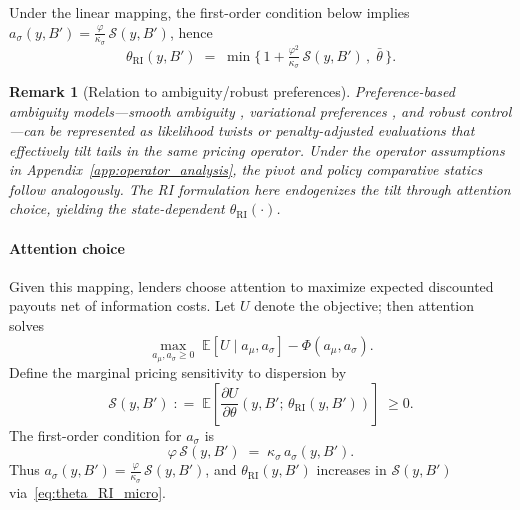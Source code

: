 \documentclass[12pt]{article}
\providecommand{\coloneqq}{\mathrel{\mathop:}=}
\theoremstyle{plain}
\newtheorem{remark}{Remark}
\newcommand{\E}{\mathbb{E}}
\begin{document}
Under the linear mapping, the first-order condition below implies
$a_\sigma(y,B')=\tfrac{\varphi}{\kappa_\sigma}\,\mathcal S(y,B')$, hence
\begin{equation}
	\theta_{\mathrm{RI}}(y,B')\;=\; \min\Big\{\,1 + \tfrac{\varphi^2}{\kappa_\sigma}\,\mathcal S(y,B')\,,\;\bar\theta\,\Big\}.
	\label{eq:theta_RI_closed}
\end{equation}

\begin{remark}[Relation to ambiguity/robust preferences]
	Preference-based ambiguity models---smooth ambiguity \citet{KlibanoffMarinacciMukerji2005}, variational preferences \citet{MaccheroniMarinacciRustichini2006}, and robust control \citet{HansenSargent2008}---can be represented as likelihood twists or penalty-adjusted evaluations that effectively tilt tails in the same pricing operator. Under the operator assumptions in Appendix~\ref{app:operator_analysis}, the pivot and policy comparative statics follow analogously. The RI formulation here endogenizes the tilt through attention choice, yielding the state-dependent $\theta_{\mathrm{RI}}(\cdot)$.
\end{remark}

\paragraph{Attention choice}
Given this mapping, lenders choose attention to maximize expected discounted
payouts net of information costs. Let $U$ denote the objective; then attention
solves
\begin{equation}
	\max_{a_\mu,a_\sigma\ge0}\; \E[U\mid a_\mu,a_\sigma] - \Phi(a_\mu,a_\sigma).
	\label{eq:att_opt_micro}
\end{equation}
Define the marginal pricing sensitivity to dispersion by
\begin{equation}
	\mathcal S(y,B') \;\coloneqq\; \E\!\left[\frac{\partial U}{\partial \theta}(y,B';\,\theta_{\mathrm{RI}}(y,B'))\right] \;\ge 0.
	\label{eq:sensitivity_def}
\end{equation}
The first-order condition for $a_\sigma$ is
\begin{equation}
	\varphi\, \mathcal S(y,B') \;=\; \kappa_\sigma\, a_\sigma(y,B').
	\label{eq:foc_sigma_micro}
\end{equation}
Thus $a_\sigma(y,B')=\tfrac{\varphi}{\kappa_\sigma}\,\mathcal S(y,B')$, and
$\theta_{\mathrm{RI}}(y,B')$ increases in $\mathcal S(y,B')$ via~\eqref{eq:theta_RI_micro}.
\end{document}
